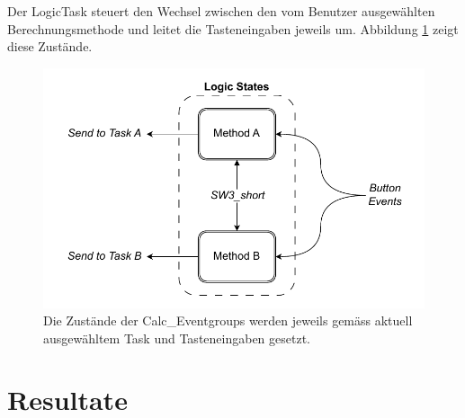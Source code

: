 \documentclass[ngerman,10pt,a4paper,titlepage]{report}
\begin{document}
	Der LogicTask steuert den Wechsel zwischen den vom Benutzer ausgewählten Berechnungsmethode und leitet die Tasteneingaben jeweils um. Abbildung \ref{fig:stateeventlogictask} zeigt diese Zustände.
	\begin{figure}
		\centering
		\includegraphics[width=0.7\linewidth]{diagrams/StateEvent_LogicTask}
		\caption{Die Zustände der Calc\_Eventgroups werden jeweils gemäss aktuell ausgewähltem Task und Tasteneingaben gesetzt.}
		\label{fig:stateeventlogictask}
	\end{figure}
	
	\chapter{Resultate}
\end{document}
